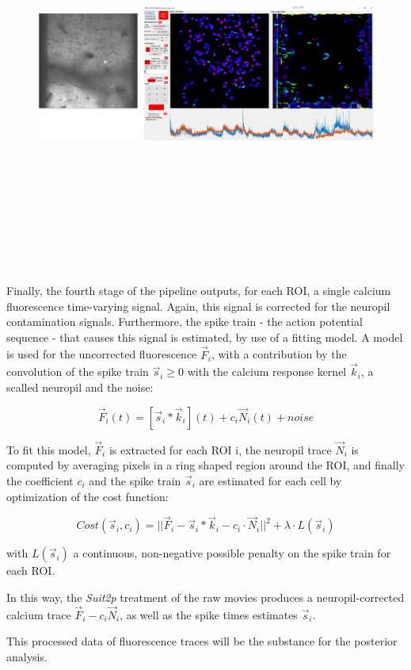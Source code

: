 \begin{figure}[H] \centering \includegraphics[width=13cm,height=13cm,keepaspectratio]{Figures/7.Results/ftraces/suit2p.png} 
\end{figure}

Finally, the fourth stage of the pipeline outputs, for each ROI, a single calcium fluorescence time-varying signal. Again, this signal is corrected for the neuropil contamination signals. Furthermore, the spike train - the action potential sequence - that causes this signal is estimated, by use of a fitting model. 
A model is used for the uncorrected fluorescence $\vec{F}_i$, with a contribution by the convolution of the spike train $\vec{s}_i \geq 0$ with the calcium response kernel $\vec{k}_i$, a scalled neuropil and the noise:

\begin{equation}
    \vec{F}_i(t) = [\vec{s}_i * \vec{k}_i](t) + c_i \vec{N}_i (t) + noise
\end{equation}

To fit this model, $\vec{F}_i$ is extracted for each ROI i, the neuropil trace $\vec{N}_i$ is computed by averaging pixels in a ring shaped region around the ROI, and finally the coefficient $c_i$ and the spike train $\vec{s}_i$ are estimated for each cell by optimization of the cost function:

\begin{equation}
    Cost(\vec{s}_i, c_i)=||\vec{F}_i - \vec{s}_i * \vec{k}_i - c_i \cdot \vec{N}_i|| ^2 + \lambda \cdot L(\vec{s}_i)
\end{equation}

with $L(\vec{s}_i)$ a continuous, non-negative possible penalty on the spike train for each ROI.

In this way, the \textit{Suit2p} treatment of the raw movies produces a neuropil-corrected calcium trace $\vec{F}_i - c_i \vec{N}_i$, as well as the spike times estimates $\vec{s}_i$.

This processed data of fluorescence traces will be the substance for the posterior analysis.